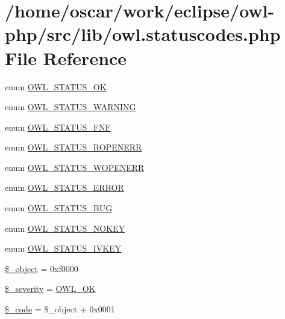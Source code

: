 \hypertarget{owl_8statuscodes_8php}{
\section{/home/oscar/work/eclipse/owl-php/src/lib/owl.statuscodes.php File Reference}
\label{owl_8statuscodes_8php}
}
\begin{CompactItemize}
\item 
enum \hyperlink{owl_8statuscodes_8php_8bbae521b65a3416f22e2879c911de3f}{OWL\_\-STATUS\_\-OK} 
\item 
enum \hyperlink{owl_8statuscodes_8php_783f6a33a00386bc20447487bc76c94e}{OWL\_\-STATUS\_\-WARNING} 
\item 
enum \hyperlink{owl_8statuscodes_8php_3e17ae43daac1a9847afaf18ae02b5f6}{OWL\_\-STATUS\_\-FNF} 
\item 
enum \hyperlink{owl_8statuscodes_8php_b67c4e6fe36a5f763d59e49ee1395a6e}{OWL\_\-STATUS\_\-ROPENERR} 
\item 
enum \hyperlink{owl_8statuscodes_8php_9d2015fb92c189204f143b637398f40c}{OWL\_\-STATUS\_\-WOPENERR} 
\item 
enum \hyperlink{owl_8statuscodes_8php_b00c7cf8190cde5630604617b408ce71}{OWL\_\-STATUS\_\-ERROR} 
\item 
enum \hyperlink{owl_8statuscodes_8php_d3a24b224b20a07e626894d7da745455}{OWL\_\-STATUS\_\-BUG} 
\item 
enum \hyperlink{owl_8statuscodes_8php_3b2d7ec8e84f7022afe7dc2c9f96e964}{OWL\_\-STATUS\_\-NOKEY} 
\item 
enum \hyperlink{owl_8statuscodes_8php_c0fd62708c370d17b251339d38cc92ca}{OWL\_\-STATUS\_\-IVKEY} 
\item 
\hyperlink{owl_8statuscodes_8php_7943a1fdb8789bfab359ae90f133b5ad}{\$\_\-object} = 0xf0000
\item 
\hyperlink{owl_8statuscodes_8php_75d6a2c33fa55d95b674d43759b59743}{\$\_\-severity} = \hyperlink{owl_8severitycodes_8php_bc72c053cfd10025fe57797c41eab18e}{OWL\_\-OK}
\item 
\hyperlink{owl_8statuscodes_8php_b644cddc92f48f9d33fe59e882fdf058}{\$\_\-code} = \$\_\-object + 0x0001
\end{CompactItemize}
